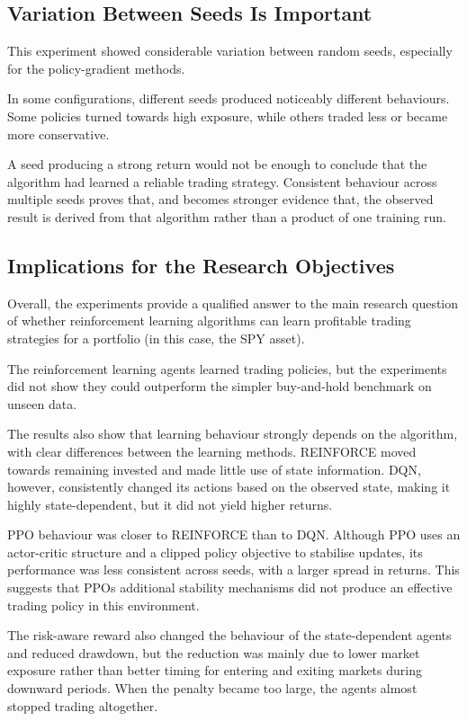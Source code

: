 \subsection{Variation Between Seeds Is Important}

This experiment showed considerable variation between random seeds,
especially for the policy-gradient methods.

In some configurations, different seeds produced noticeably different
behaviours. Some policies turned towards high exposure, while others
traded less or became more conservative.

A seed producing a strong return would not be enough to conclude that
the algorithm had learned a reliable trading strategy. Consistent
behaviour across multiple seeds proves that, and becomes stronger
evidence that, the observed result is derived from that algorithm rather
than a product of one training run.

\subsection{Implications for the Research Objectives}

Overall, the experiments provide a qualified answer to the main research
question of whether reinforcement learning algorithms can learn
profitable trading strategies for a portfolio (in this case, the SPY
asset).

The reinforcement learning agents learned trading policies, but the
experiments did not show they could outperform the simpler buy-and-hold
benchmark on unseen data.

The results also show that learning behaviour strongly depends on the
algorithm, with clear differences between the learning methods.
REINFORCE moved towards remaining invested and made little use of state
information. DQN, however, consistently changed its actions based on the
observed state, making it highly state-dependent, but it did not yield
higher returns.

PPO behaviour was closer to REINFORCE than to DQN. Although PPO uses an
actor-critic structure and a clipped policy objective to stabilise
updates, its performance was less consistent across seeds, with a larger
spread in returns. This suggests that PPO\textquotesingle s additional
stability mechanisms did not produce an effective trading policy in this
environment.

The risk-aware reward also changed the behaviour of the state-dependent
agents and reduced drawdown, but the reduction was mainly due to lower
market exposure rather than better timing for entering and exiting
markets during downward periods. When the penalty became too large, the
agents almost stopped trading altogether.

